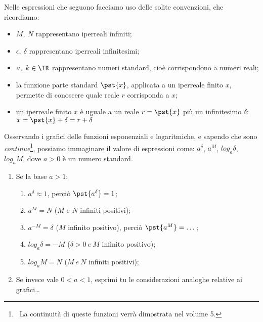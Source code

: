 Nelle espressioni che seguono facciamo uso delle solite convenzioni, che 
ricordiamo:
\begin{itemize}[nosep]
 \item $M, \ N$ rappresentano iperreali infiniti;
 \item $\epsilon, \ \delta$ rappresentano iperreali infinitesimi;
 \item $a, \ k \in \IR$ rappresentano numeri standard, cioè corrispondono a 
numeri reali;
 \item la funzione parte standard $\pst{x}$, applicata a un iperreale 
finito $x$, permette di conoscere quale reale $r$ corrisponda a $x$; 
 \item un iperreale finito $x$ è uguale a un reale $r=\pst{x}$ più un 
infinitesimo $\delta$: \\
\(x=\pst{x}+\delta=r+\delta\)
\end{itemize}

Osservando i grafici delle funzioni esponenziali e logaritmiche, 
e sapendo che sono \emph{continue}\footnote{
~La continuità di queste funzioni verrà dimostrata nel volume 5.},
possiamo immaginare il valore di espressioni come: 
\(a^\delta\), \(a^M\), \(log_a\delta\), \(log_a M\), 
dove \(a>0\) è un numero standard.
\begin{enumerate}[nosep]
 \item Se la base $a>1$:
  \begin{enumerate}[nosep]
   \item \(a^\delta \approx 1\), perciò \(\pst{a^\delta}=1\);
   \item \(a^M = N\) ($M$ e $N$ infiniti positivi);
   \item \(a^{-M} = \delta\) ($M$ infinito positivo), perciò 
   \(\pst{a^M}=\dots\);
   \item $log_a \delta= -M$ ($\delta >0 ~ e ~ M$ infinito positivo);
   \item $log_a M= N$ ($M ~ e ~ N$ infiniti positivi);
  \end{enumerate}
 \item Se invece vale $0<a<1$, esprimi tu le considerazioni analoghe 
relative ai grafici\dots
\end{enumerate}



